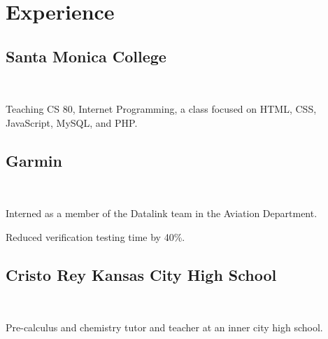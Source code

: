 \documentclass[letterpaper]{deedy-resume} %
\begin{document}
\begin{minipage}[t]{0.66\textwidth}
\sectionspace %


\section{Experience}

\subsection{Santa Monica College}
 \hfill {} \\
\smallsectionspace
\vspace{\topsep} %
\begin{tightitemize}
\item Teaching CS 80, Internet Programming, a class focused on HTML, CSS, JavaScript, MySQL, and PHP.
\end{tightitemize}

\sectionspace %


\subsection{Garmin}
 \hfill {} \\
\begin{tightitemize}
\item Interned as a member of the Datalink team in the Aviation Department. 
\item Reduced verification testing time by 40\%.
\end{tightitemize}

\sectionspace %


\subsection{Cristo Rey Kansas City High School}
 \hfill {} \\
\begin{tightitemize}
\item Pre-calculus and chemistry tutor and teacher at an inner city high school. 
\end{tightitemize}


\end{minipage}
\end{document}
